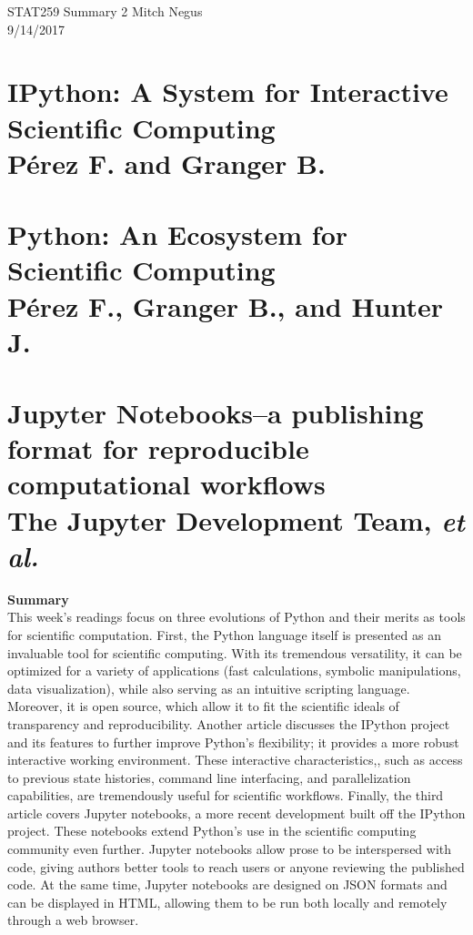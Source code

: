 \documentclass{report}
\begin{document}
\thispagestyle{empty}
\sffamily

\large {STAT259 Summary {2} \hfill Mitch Negus\\
		\hspace*{\fill} 9/14/2017\\ }
\section*{\textsf{IPython: A System for Interactive Scientific Computing \\ \normalsize P\'erez F. and Granger B.}}
\section*{\textsf{Python: An Ecosystem for Scientific Computing \\ \normalsize P\'erez F., Granger B., and Hunter J.}}
\section*{\textsf{Jupyter Notebooks--a publishing format for reproducible computational workflows \\ \normalsize The Jupyter Development Team,} \small \textit{et al.}}

\textbf{Summary}\\
This week's readings focus on three evolutions of Python and their merits as tools for scientific computation. First, the Python language itself is presented as an invaluable tool for scientific computing. With its tremendous versatility, it can be optimized for a variety of applications (fast calculations, symbolic manipulations, data visualization), while also serving as an intuitive scripting language. Moreover, it is open source, which allow it to fit the scientific ideals of transparency and reproducibility. Another article discusses the IPython project and its features to further improve Python's flexibility; it provides a more robust interactive working environment. These interactive characteristics,, such as access to previous state histories, command line interfacing, and parallelization capabilities, are tremendously useful for scientific workflows. Finally, the third article covers Jupyter notebooks, a more recent development built off the IPython project. These notebooks extend Python's use in the scientific computing community even further. Jupyter notebooks allow prose to be interspersed with code, giving authors better tools to reach users or anyone reviewing the published code. At the same time, Jupyter notebooks are designed on JSON formats and can be displayed in HTML, allowing them to be run both locally and remotely through a web browser.
\end{document}
